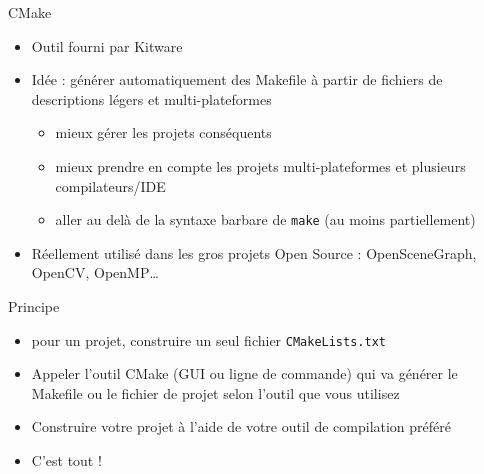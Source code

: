 \begin{frame}{CMake}

\begin{itemize}
\itemsep1pt\parskip0pt
\item
  Outil fourni par Kitware
\item
  Idée : générer automatiquement des Makefile à partir de fichiers de
  descriptions légers et multi-plateformes

  \begin{itemize}
  \itemsep1pt\parskip0pt
  \item
    mieux gérer les projets conséquents
  \item
    mieux prendre en compte les projets multi-plateformes et plusieurs
    compilateurs/IDE
  \item
    aller au delà de la syntaxe barbare de \texttt{make} (au moins partiellement)
  \end{itemize}
\item
  Réellement utilisé dans les gros projets Open Source : OpenSceneGraph,
  OpenCV, OpenMP\ldots{}
\end{itemize}

\end{frame}

\begin{frame}{Principe}

\begin{itemize}
\itemsep1pt\parskip0pt
\item
  pour un projet, construire un seul fichier \texttt{CMakeLists.txt}
\item
  Appeler l'outil CMake (GUI ou ligne de commande) qui va générer le
  Makefile ou le fichier de projet selon l'outil que vous utilisez
\item
  Construire votre projet à l'aide de votre outil de compilation préféré
\item
  C'est tout !
\end{itemize}

\end{frame}

